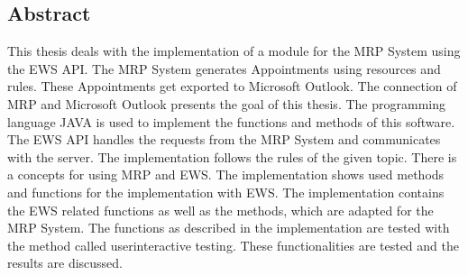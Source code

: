 \begin{english}
\chapter{Abstract}
This thesis deals with the implementation of a module for the MRP System using the EWS API. The MRP System generates Appointments using resources and rules. These Appointments get exported to Microsoft Outlook. The connection of MRP and Microsoft Outlook presents the goal of this thesis. The programming language JAVA is used to implement the functions and methods of this software. The EWS API handles the requests from the MRP System and communicates with the server. The implementation follows the rules of the given topic. There is a concepts for using MRP and EWS. The implementation shows used methods and functions for the implementation with EWS. The implementation contains the EWS related functions as well as the methods, which are adapted for the MRP System. The functions as described in the implementation are tested with the method called userinteractive testing. These functionalities are tested and the results are discussed.
\end{english} 
